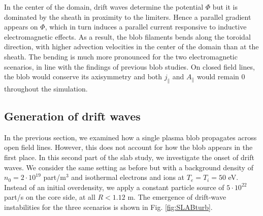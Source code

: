In the center of the domain, drift waves determine the potential $\Phi$ but it is dominated by the sheath in proximity to the limiters. Hence a parallel gradient appears on $\Phi$, which in turn induces a parallel current responsive to inductive electromagnetic effects. As a result, the blob filaments bends along the toroidal direction, with higher advection velocities in the center of the domain than at the sheath. The bending is much more pronounced for the two electromagnetic scenarios, in line with the findings of previous blob studies\cite{lee2015,lee2015electromagnetic,Stepanenko_2020}. On closed field lines, the blob would conserve its axisymmetry and both $j_\parallel$ and $A_\parallel$ would remain 0 throughout the simulation. \newline




\subsection{Generation of drift waves}
\label{ssec:plasmaturbslab}

In the previous section, we examined how a single plasma blob propagates across open field lines. However, this does not account for how the blob appears in the first place. In this second part of the slab study, we investigate the onset of drift waves. We consider the same setting as before but with a background density of $n_0 = 2 \cdot 10^{19}$ part/m$^3$ and isothermal electrons and ions at $T_e = T_i = 50$ eV. Instead of an initial overdensity, we apply a constant particle source of $5 \cdot 10^{22}$ part/s on the core side, at all $R < 1.12$ m. The emergence of drift-wave instabilities for the three scenarios is shown in Fig. \ref{fig:SLABturb}. \newline

